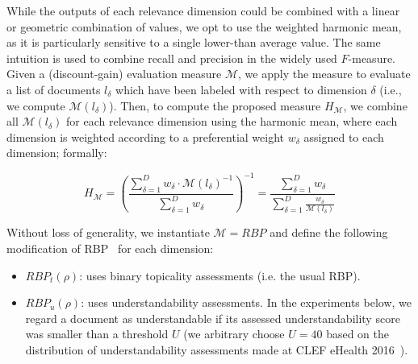 While the outputs of each relevance dimension could be combined with a linear or geometric combination of values, we opt to use the weighted harmonic mean, as it is particularly sensitive to a single lower-than average value. The same intuition is used to combine recall and precision in the widely used $F$-measure. 
Given a (discount-gain) evaluation measure $\mathcal{M}$, we apply the measure to evaluate a list of  documents $l_\delta$ which have been labeled with respect to dimension $\delta$ (i.e., we compute $\mathcal{M}(l_\delta)$). Then, to compute the proposed measure $H_\mathcal{M}$, we combine all $\mathcal{M}(l_\delta)$ for each relevance dimension using the harmonic mean, where each dimension is weighted according to a preferential weight $w_\delta$ assigned to each dimension; formally:


\begin{equation}
    H_\mathcal{M}  = \left( \frac{\sum\limits_{\delta=1}^D w_\delta \cdot \mathcal{M}(l_\delta)^{-1}}{\sum\limits_{\delta=1}^D w_\delta} \right)^{-1}
          = \frac{\sum\limits_{\delta=1}^D w_\delta}{\sum\limits_{\delta=1}^D \frac{w_\delta}{\mathcal{M}(l_\delta)}}
\label{eq:H}
\end{equation}

%
%
%


%
Without loss of generality, we instantiate $\mathcal{M} = RBP$ and define the following modification of RBP~\cite{moffat08} for each dimension:
%
\begin{itemize}[leftmargin=*]
	\item $RBP_t(\rho)$: uses binary topicality assessments (i.e. the usual RBP). 
%	
    \item $RBP_u(\rho)$: uses understandability assessments. In the experiments below, we regard a document as understandable if its assessed understandability score was smaller than a threshold $U$ (we arbitrary choose $U = 40$ based on the distribution of understandability assessments made at CLEF eHealth 2016~\cite{clefIR16}).
\end{itemize}

